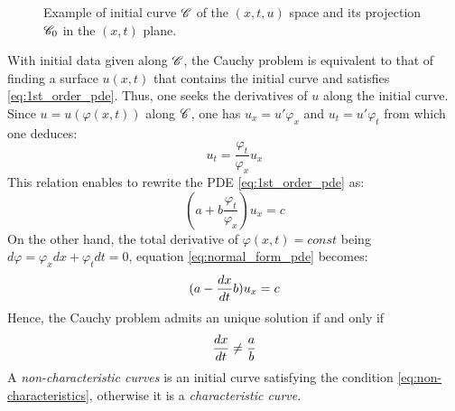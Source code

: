 \begin{figure}[h]
  \centering
  
  \caption{Example of initial curve $\mathscr{C}$ of the $(x,t,u)$ space and its projection $\mathscr{C}_0$ in the $(x,t)$ plane.}
  \label{fig:initial_curve}
\end{figure}
With initial data given along $\mathscr{C}$, the Cauchy problem is equivalent to that of finding a surface $u(x,t)$ that contains the initial curve and satisfies \eqref{eq:1st_order_pde}. Thus, one seeks the derivatives of $u$ along the initial curve. Since $u=u(\varphi(x,t))$ along $\mathscr{C}$, one has $u_x = u' \varphi_x $ and $u_t = u' \varphi_t$ from which one deduces:
\begin{equation*}
  u_t = \frac{\varphi_t}{\varphi_x}u_x 
\end{equation*}
This relation enables to rewrite the PDE \eqref{eq:1st_order_pde} as:
\begin{equation}
  \label{eq:normal_form_pde}
  (a + b\frac{\varphi_t}{\varphi_x})u_x = c
\end{equation}
On the other hand, the total derivative of $\varphi(x,t)=const$ being $d\varphi = \varphi_x dx + \varphi_t dt =0$, equation \eqref{eq:normal_form_pde} becomes:
\begin{equation}
  \label{eq:normal_form_pde_2}
  (a - \frac{d x}{d t}b)u_x = c
\end{equation}
Hence, the Cauchy problem admits an unique solution if and only if
\begin{equation}
  \label{eq:non-characteristics}
  \frac{d x}{d t}\neq \frac{a}{b}
\end{equation}
A \textit{non-characteristic curves} is an initial curve satisfying the condition \eqref{eq:non-characteristics}, otherwise it is a \textit{characteristic curve}. 

